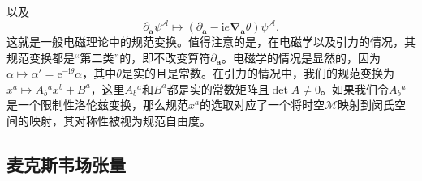 以及
\begin{equation*}
	\partial _{\boldsymbol{a}} \psi ^{\mathcal{A}} \mapsto (\partial _{\boldsymbol{a}} -\mathrm{i} e\boldsymbol{\nabla }_{\boldsymbol{a}} \theta )\psi ^{\mathcal{A}} .
\end{equation*}
这就是一般电磁理论中的规范变换。值得注意的是，在电磁学以及引力的情况，其规范变换都是“第二类”的，即不改变算符$\partial _{\boldsymbol{a}}$。电磁学的情况是显然的，因为$\alpha \mapsto \alpha '=\mathrm{e}^{-\mathrm{i} \theta } \alpha $，其中$\theta $是实的且是常数。在引力的情况中，我们的规范变换为$x^{a} \mapsto A{_{b}}^{a} x^{b} +B^{a}$，这里$A{_{b}}^{a}$和$B^{a}$都是实的常数矩阵且$\det A\neq 0$。如果我们令$A{_{b}}^{a}$是一个限制性洛伦兹变换，那么规范$x^{a}$的选取对应了一个将时空$\mathcal{M}$映射到闵氏空间的映射，其对称性被视为规范自由度。


\subsection{麦克斯韦场张量}

